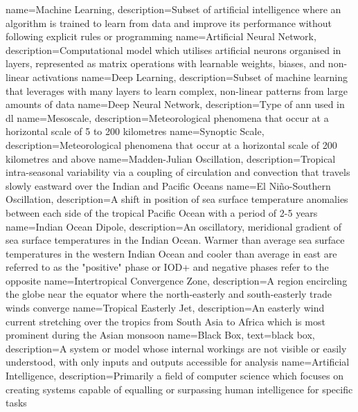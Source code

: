 {
    name=Machine Learning,
    description={Subset of artificial intelligence where an algorithm is trained to learn from data and improve its performance without following explicit rules or programming}
}
{
    name=Artificial Neural Network,
    description={Computational model which utilises artificial neurons organised in layers, represented as matrix operations with learnable weights, biases, and non-linear activations}
}
{
    name=Deep Learning,
    description={Subset of machine learning that leverages  with many layers to learn complex, non-linear patterns from large amounts of data}
}
{
    name=Deep Neural Network,
    description={Type of \acrfull{ann} used in \acrfull{dl}}
}
{
    name=Mesoscale,
    description={Meteorological phenomena that occur at a horizontal scale of 5 to 200 kilometres}
}
{
    name=Synoptic Scale,
    description={Meteorological phenomena that occur at a horizontal scale of 200 kilometres and above}
}
{
    name=Madden-Julian Oscillation,
    description={Tropical intra-seasonal variability via a coupling of circulation and convection that travels slowly eastward over the Indian and Pacific Oceans}
}
{
    name=El Niño-Southern Oscillation,
    description={A shift in position of sea surface temperature anomalies between each side of the tropical Pacific Ocean with a period of 2-5 years}
}
{
    name=Indian Ocean Dipole,
    description={An oscillatory, meridional gradient of sea surface temperatures in the Indian Ocean. Warmer than average sea surface temperatures in the western Indian Ocean and cooler than average in east are referred to as the "positive" phase or IOD+ and negative phases refer to the opposite}
}
{
    name=Intertropical Convergence Zone,
    description={A region encircling the globe near the equator where the north-easterly and south-easterly trade winds converge}
}
{
    name=Tropical Easterly Jet,
    description={An easterly wind current stretching over the tropics from South Asia to Africa which is most prominent during the Asian monsoon}
}
{
    name=Black Box,
    text={black box},
    description={A system or model whose internal workings are not visible or easily understood, with only inputs and outputs accessible for analysis}
}
{
    name=Artificial Intelligence,
    description={Primarily a field of computer science which focuses on creating systems capable of equalling or surpassing human intelligence for specific tasks}
}

